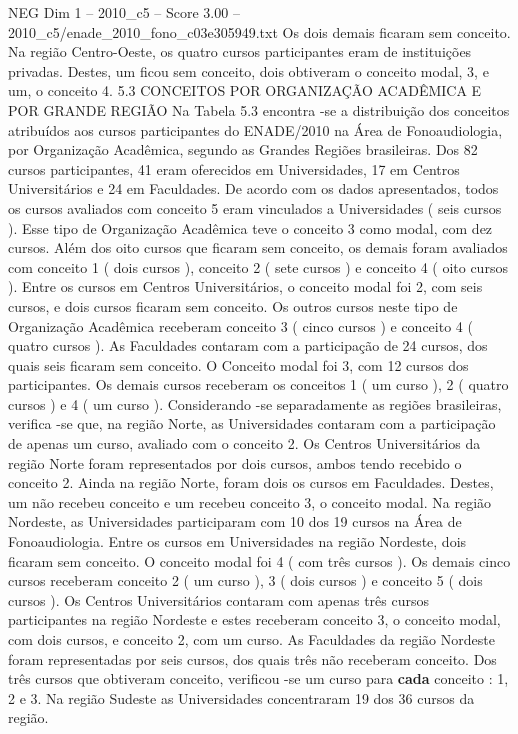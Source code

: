 \begin{textsample}{NEG Dim 1 – 2010\_c5 – Score 3.00 – 2010\_c5/enade\_2010\_fono\_c03e305949.txt}
Os dois demais ficaram sem conceito.
Na região Centro-Oeste, os quatro cursos participantes eram de instituições privadas.
Destes, um ficou sem conceito, dois obtiveram o conceito modal, 3, e um, o conceito 4. 5.3 CONCEITOS POR ORGANIZAÇÃO ACADÊMICA E POR GRANDE REGIÃO Na Tabela 5.3 encontra -se a distribuição dos conceitos atribuídos aos cursos participantes do ENADE/2010 na Área de Fonoaudiologia, por Organização Acadêmica, segundo as Grandes Regiões brasileiras.
Dos 82 cursos participantes, 41 eram oferecidos em Universidades, 17 em Centros Universitários e 24 em Faculdades.
De acordo com os dados apresentados, todos os cursos avaliados com conceito 5 eram vinculados a Universidades ( seis cursos ).
Esse tipo de Organização Acadêmica teve o conceito 3 como modal, com dez cursos.
Além dos oito cursos que ficaram sem conceito, os demais foram avaliados com conceito 1 ( dois cursos ), conceito 2 ( sete cursos ) e conceito 4 ( oito cursos ).
Entre os cursos em Centros Universitários, o conceito modal foi 2, com seis cursos, e dois cursos ficaram sem conceito.
Os outros cursos neste tipo de Organização Acadêmica receberam conceito 3 ( cinco cursos ) e conceito 4 ( quatro cursos ).
As Faculdades contaram com a participação de 24 cursos, dos quais seis ficaram sem conceito.
O Conceito modal foi 3, com 12 cursos dos participantes.
Os demais cursos receberam os conceitos 1 ( um curso ), 2 ( quatro cursos ) e 4 ( um curso ).
Considerando -se separadamente as regiões brasileiras, verifica -se que, na região Norte, as Universidades contaram com a participação de apenas um curso, avaliado com o conceito 2.
Os Centros Universitários da região Norte foram representados por dois cursos, ambos tendo recebido o conceito 2.
Ainda na região Norte, foram dois os cursos em Faculdades.
Destes, um não recebeu conceito e um recebeu conceito 3, o conceito modal.
Na região Nordeste, as Universidades participaram com 10 dos 19 cursos na Área de Fonoaudiologia.
Entre os cursos em Universidades na região Nordeste, dois ficaram sem conceito.
O conceito modal foi 4 ( com três cursos ).
Os demais cinco cursos receberam conceito 2 ( um curso ), 3 ( dois cursos ) e conceito 5 ( dois cursos ).
Os Centros Universitários contaram com apenas três cursos participantes na região Nordeste e estes receberam conceito 3, o conceito modal, com dois cursos, e conceito 2, com um curso.
As Faculdades da região Nordeste foram representadas por seis cursos, dos quais três não receberam conceito.
Dos três cursos que obtiveram conceito, verificou -se um curso para \textbf{cada} conceito : 1, 2 e 3.
Na região Sudeste as Universidades concentraram 19 dos 36 cursos da região.

\end{textsample}
